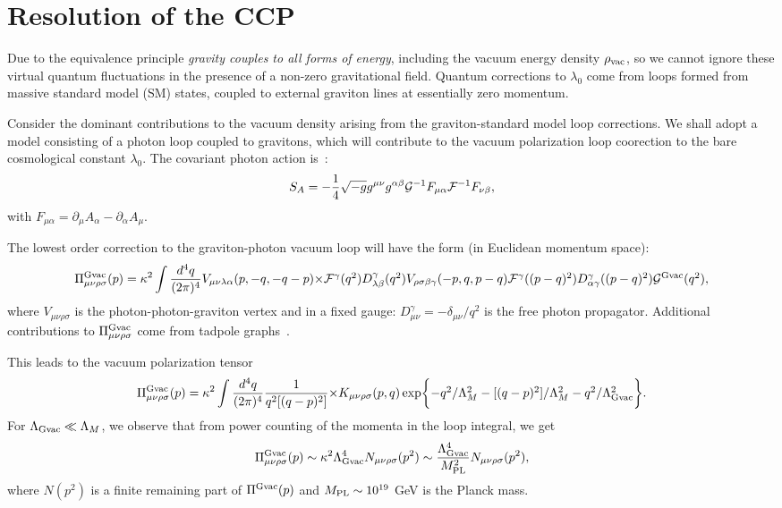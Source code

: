 \documentclass[a4paper,11pt]{article}
\begin{document}
\section{\bf Resolution of the CCP}

Due to the equivalence principle {\it gravity couples to all
forms of energy}, including the vacuum energy density $\rho_{\rm
vac}$, so we cannot ignore these virtual quantum
fluctuations in the presence of a non-zero gravitational field.
Quantum corrections to $\lambda_0$ come from loops formed from
massive standard model (SM) states, coupled to external graviton
lines at essentially zero momentum.

Consider the dominant contributions to the vacuum
density arising from the graviton-standard model loop corrections.
We shall adopt a model consisting of a photon loop coupled to
gravitons, which will contribute to the vacuum polarization loop coorection
to the bare cosmological constant $\lambda_0$. The covariant photon action
is~\cite{Leibbrandt}:
\begin{equation}
S_A=-\frac{1}{4}\sqrt{-g}g^{\mu\nu}g^{\alpha\beta}{\cal
G}^{-1}F_{\mu\alpha}{\cal F}^{-1}F_{\nu\beta},
\end{equation} with
$F_{\mu\alpha}=\partial_\mu A_\alpha-\partial_\alpha A_\mu$.

The lowest order correction to the graviton-photon vacuum loop will have
the form (in Euclidean momentum space):
\begin{equation}
\Pi^{\rm Gvac}_{\mu\nu\rho\sigma}(p)
=\kappa^2\int\frac{d^4q}{(2\pi)^4}V_{\mu\nu\lambda\alpha}(p,-q,-q-p)
$$ $$
\times{\cal
F}^\gamma(q^2)D^\gamma_{\lambda\beta}(q^2)V_{\rho\sigma\beta\gamma}(-p,q,p-q)
{\cal F}^\gamma((p-q)^2)D^\gamma_{\alpha\gamma}((p-q)^2){\cal G}^{\rm
Gvac}(q^2), \end{equation}
where $V_{\mu\nu\rho\sigma}$ is the
photon-photon-graviton vertex and in a fixed gauge:
$D^\gamma_{\mu\nu}=-\delta_{\mu\nu}/q^2$
is the free photon propagator. Additional contributions to
$\Pi^{\rm Gvac}_{\mu\nu\rho\sigma}$ come from tadpole
graphs~\cite{Leibbrandt}.

This leads to the vacuum polarization tensor
\begin{equation}
\label{Ptensor}
\Pi^{\rm Gvac}_{\mu\nu\rho\sigma}(p)=\kappa^2
\int\frac{d^4q}{(2\pi)^4}\frac{1}{q^2[(q-p)^2]}
$$ $$
\times K_{\mu\nu\rho\sigma}(p,q)
\exp\biggl\{-q^2/\Lambda^2_M
-[(q-p)^2]/\Lambda^2_M-q^2/\Lambda^2_{{\rm Gvac}}\biggr\}.
\end{equation}
For $\Lambda_{{\rm Gvac}} \ll \Lambda_M$, we
observe that from power counting of the momenta in the loop integral, we
get
\begin{equation}
\Pi^{\rm {\rm Gvac}}_{\mu\nu\rho\sigma}(p)\sim
\kappa^2\Lambda_{{\rm Gvac}}^4N_{\mu\nu\rho\sigma}(p^2)
\sim\frac{\Lambda_{{\rm Gvac}}^4}{M^2_{\rm PL}}N_{\mu\nu\rho\sigma}(p^2),
\end{equation}
where $N(p^2)$ is a finite remaining part of $\Pi^{\rm {\rm Gvac}}(p)$ and
$M_{\rm PL}\sim 10^{19}$ GeV is the Planck mass.
\end{document}
